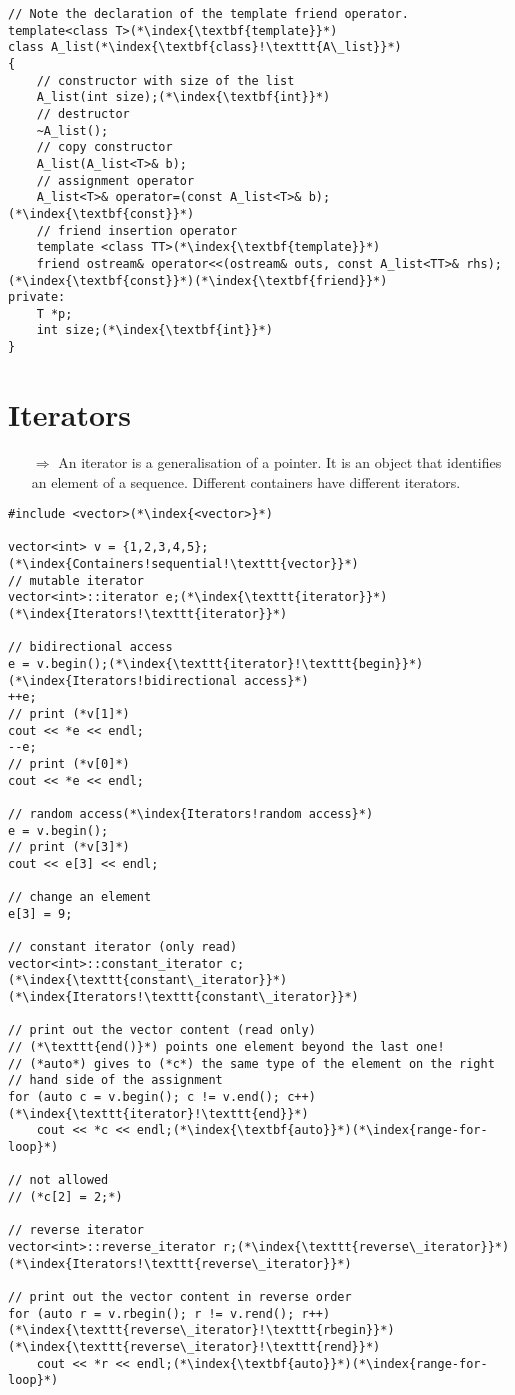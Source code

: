 \documentclass[10pt]{article}
\begin{document}
\begin{lstlisting}
// Note the declaration of the template friend operator.
template<class T>(*\index{\textbf{template}}*)
class A_list(*\index{\textbf{class}!\texttt{A\_list}}*)
{
    // constructor with size of the list
    A_list(int size);(*\index{\textbf{int}}*)
    // destructor
    ~A_list();
    // copy constructor
    A_list(A_list<T>& b);
    // assignment operator
    A_list<T>& operator=(const A_list<T>& b);(*\index{\textbf{const}}*)
    // friend insertion operator
    template <class TT>(*\index{\textbf{template}}*)
    friend ostream& operator<<(ostream& outs, const A_list<TT>& rhs);(*\index{\textbf{const}}*)(*\index{\textbf{friend}}*)
private:
    T *p;
    int size;(*\index{\textbf{int}}*)
}
\end{lstlisting}
%
%
\section{Iterators}
\small
\begin{enumerate}
\item[$\Rightarrow$] An iterator is a generalisation of a pointer. It is an object that identifies an element of a sequence. Different containers have
different iterators.
\end{enumerate}
\begin{lstlisting}
#include <vector>(*\index{<vector>}*)

vector<int> v = {1,2,3,4,5};(*\index{Containers!sequential!\texttt{vector}}*)
// mutable iterator
vector<int>::iterator e;(*\index{\texttt{iterator}}*)(*\index{Iterators!\texttt{iterator}}*)

// bidirectional access
e = v.begin();(*\index{\texttt{iterator}!\texttt{begin}}*)(*\index{Iterators!bidirectional access}*)
++e;
// print (*v[1]*)
cout << *e << endl;
--e;
// print (*v[0]*)
cout << *e << endl;

// random access(*\index{Iterators!random access}*)
e = v.begin();
// print (*v[3]*)
cout << e[3] << endl;

// change an element
e[3] = 9;

// constant iterator (only read)
vector<int>::constant_iterator c;(*\index{\texttt{constant\_iterator}}*)(*\index{Iterators!\texttt{constant\_iterator}}*)

// print out the vector content (read only)
// (*\texttt{end()}*) points one element beyond the last one!
// (*auto*) gives to (*c*) the same type of the element on the right
// hand side of the assignment
for (auto c = v.begin(); c != v.end(); c++)(*\index{\texttt{iterator}!\texttt{end}}*)
    cout << *c << endl;(*\index{\textbf{auto}}*)(*\index{range-for-loop}*)

// not allowed
// (*c[2] = 2;*)

// reverse iterator
vector<int>::reverse_iterator r;(*\index{\texttt{reverse\_iterator}}*)(*\index{Iterators!\texttt{reverse\_iterator}}*)

// print out the vector content in reverse order
for (auto r = v.rbegin(); r != v.rend(); r++)(*\index{\texttt{reverse\_iterator}!\texttt{rbegin}}*)(*\index{\texttt{reverse\_iterator}!\texttt{rend}}*)
    cout << *r << endl;(*\index{\textbf{auto}}*)(*\index{range-for-loop}*)
\end{lstlisting}
\end{document}
